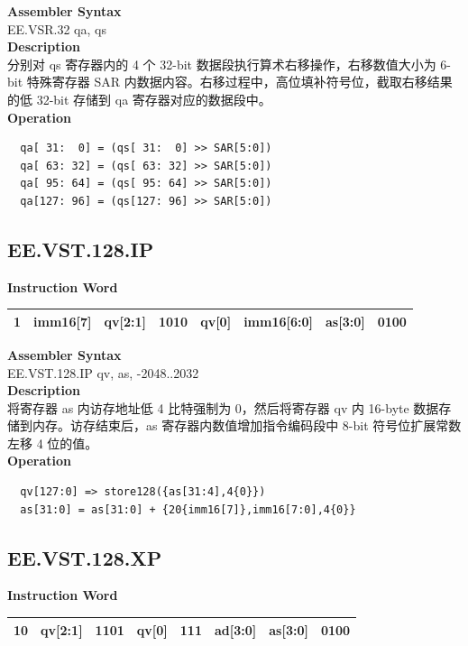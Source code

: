 \textbf{Assembler Syntax} \\
EE.VSR.32 qa, qs \\
\textbf{Description} \\
分别对 qs 寄存器内的 4 个 32-bit 数据段执行算术右移操作，右移数值大小为 6-bit 特殊寄存器 SAR 内数据内容。右移过程中，高位填补符号位，截取右移结果的低 32-bit 存储到 qa 寄存器对应的数据段中。\\
\textbf{Operation}
\begin{lstlisting}
  qa[ 31:  0] = (qs[ 31:  0] >> SAR[5:0])
  qa[ 63: 32] = (qs[ 63: 32] >> SAR[5:0])
  qa[ 95: 64] = (qs[ 95: 64] >> SAR[5:0])
  qa[127: 96] = (qs[127: 96] >> SAR[5:0])
\end{lstlisting}

\clearpage
\subsection{EE.VST.128.IP}\label{instruction:EEVST128IP}
\setlength\tabcolsep{6pt}
\textbf{Instruction Word} \\
\begin{tabular}{|c|c|c|c|c|c|c|c|}
	\hline
	1 & imm16[7] & qv[2:1] & 1010 & qv[0] & imm16[6:0] & as[3:0] & 0100 \\
	\hline
\end{tabular}

\textbf{Assembler Syntax} \\
EE.VST.128.IP qv, as, -2048..2032 \\
\textbf{Description} \\
将寄存器 as 内访存地址低 4 比特强制为 0，然后将寄存器 qv 内 16-byte 数据存储到内存。访存结束后，as 寄存器内数值增加指令编码段中 8-bit 符号位扩展常数左移 4 位的值。\\
\textbf{Operation}
\begin{lstlisting}
  qv[127:0] => store128({as[31:4],4{0}})
  as[31:0] = as[31:0] + {20{imm16[7]},imm16[7:0],4{0}}
\end{lstlisting}

\clearpage
\subsection{EE.VST.128.XP}\label{instruction:EEVST128XP}
\setlength\tabcolsep{6pt}
\textbf{Instruction Word} \\
\begin{tabular}{|c|c|c|c|c|c|c|c|}
	\hline
	10 & qv[2:1] & 1101 & qv[0] & 111 & ad[3:0] & as[3:0] & 0100 \\
	\hline
\end{tabular}

